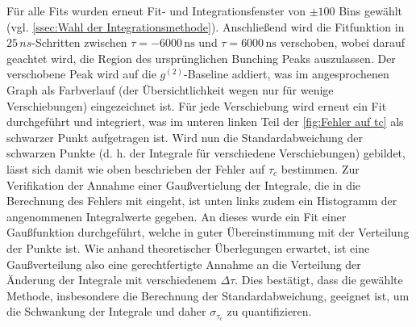 Für alle Fits wurden erneut Fit- und Integrationsfenster von $\pm 100$ Bins gewählt (vgl. \autoref{ssec:Wahl der Integrationsmethode}). 
Anschließend wird die Fitfunktion in $25\,ns$-Schritten zwischen $\tau = -6000\,\mathrm{ns}$ und $\tau = 6000\,\mathrm{ns}$ verschoben, wobei darauf geachtet wird, die Region des ursprünglichen Bunching Peaks auszulassen. 
Der verschobene Peak wird auf die $g^{(2)}$-Baseline addiert, was im angesprochenen Graph als Farbverlauf (der Übersichtlichkeit wegen nur für wenige Verschiebungen) eingezeichnet ist. 
Für jede Verschiebung wird erneut ein Fit durchgeführt und integriert, was im unteren linken Teil der \autoref{fig:Fehler auf tc} als schwarzer Punkt aufgetragen ist. 
Wird nun die Standardabweichung der schwarzen Punkte (d. h. der Integrale für verschiedene Verschiebungen) gebildet, lässt sich damit wie oben beschrieben der Fehler auf $\tau_c$ bestimmen. 
Zur Verifikation der Annahme einer Gaußvertielung der Integrale, die in die Berechnung des Fehlers mit eingeht, ist unten links zudem ein Histogramm der angenommenen Integralwerte gegeben. 
An dieses wurde ein Fit einer Gaußfunktion durchgeführt, welche in guter Übereinstimmung mit der Verteilung der Punkte ist. 
Wie anhand theoretischer Überlegungen erwartet, ist eine Gaußverteilung also eine gerechtfertigte Annahme an die Verteilung der Änderung der Integrale mit verschiedenem $\Delta\tau$. 
Dies bestätigt, dass die gewählte Methode, insbesondere die Berechnung der Standardabweichung, geeignet ist, um die Schwankung der Integrale und daher $\sigma_{\tau_c}$ zu quantifizieren. 

